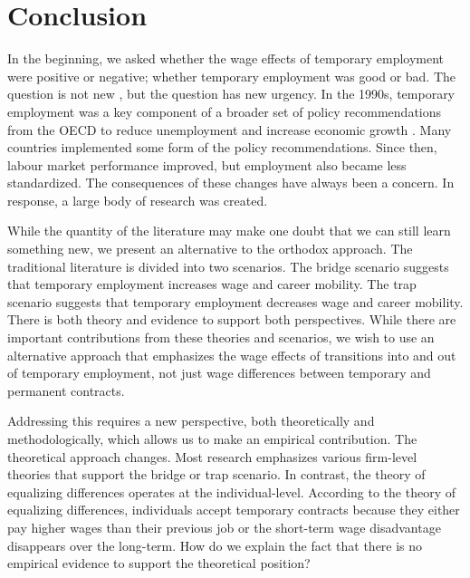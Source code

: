 \documentclass[12pt]{article}
\begin{document}
\section{Conclusion}

In the beginning, we asked whether the wage effects of temporary employment were positive or negative; whether temporary employment was good or bad.  The question is not new  \citep{kalleberg_nonstandard_2000}, but the question has new urgency.  In the 1990s, temporary employment was a key component of a broader set of policy recommendations from the OECD to reduce unemployment and increase economic growth \citep{oecd_oecd_1996}.  Many countries implemented some form of the policy recommendations. Since then, labour market performance improved, but employment also became less standardized. The consequences of these changes have always been a concern. In response, a large body of research was created.  

While the quantity of the literature may make one doubt that we can still learn something new, we present an alternative to the orthodox approach.  The traditional literature is divided into two scenarios.  The bridge scenario suggests that temporary employment increases wage and career mobility.  The trap scenario suggests that temporary employment decreases wage and career mobility.  There is both theory and evidence to support both perspectives.  While there are important contributions from these theories and scenarios, we wish to use an alternative approach that emphasizes the wage effects of transitions into and out of temporary employment, not just wage differences between temporary and permanent contracts.

Addressing this requires a new perspective, both theoretically and methodologically, which allows us to make an empirical contribution.  The theoretical approach changes.  Most research emphasizes various firm-level theories that support the bridge or trap scenario.  In contrast, the theory of equalizing differences operates at the individual-level.  According to the theory of equalizing differences, individuals accept temporary contracts because they either pay higher wages than their previous job or the short-term wage disadvantage disappears over the long-term.  How do we explain the fact that there is no empirical evidence to support the theoretical position?  
\end{document}
